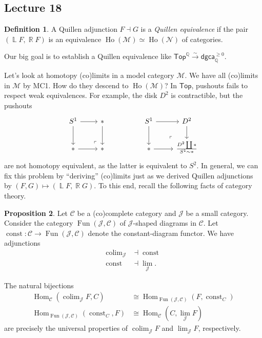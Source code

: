 \documentclass[10pt,letterpaper,cm]{nupset}
\theoremstyle{definition}
\newtheorem{defn}{Definition}[subsection]
\theoremstyle{theorem}
\newtheorem{prop}[defn]{Proposition}
\theoremstyle{remark}
\DeclareMathOperator{\Ll}{\mathbb L}
\newcommand{\Q}{\mathbb Q}
\DeclareMathOperator{\R}{\mathbb{R}}
\newcommand{\1}{\mathbb{1}}
\renewcommand{\c}{\mathcal{C}}
\renewcommand{\j}{\mathcal{J}}
\newcommand{\n}{\mathcal{N}}
\newcommand{\m}{\mathcal{M}}
\newcommand{\dgca}{\mathsf{dgca}}
\newcommand{\0}{\vec 0}
\DeclareMathOperator{\fun}{Fun}
\DeclareMathOperator{\ho}{Ho}
\DeclareMathOperator{\Hom}{Hom}
\DeclareMathOperator{\colim}{colim}
\DeclareMathOperator{\const}{const}
\begin{document}
\subsection{Lecture 18}

\begin{defn}
A Quillen adjunction $F \dashv G$ is a \textit{Quillen equivalence} if the pair $\left(\Ll{F}, \R{F}\right)$ is an equivalence $\ho(\m) \simeq \ho(\n)$ of categories. 
\end{defn}

Our big goal is to establish a Quillen equivalence like $\mathsf{Top}^{\Q} \xrightarrow{\sim} \dgca_{\Q}^{\geq 0}$.

\bigskip

Let's look at homotopy (co)limits in a model category $\m$. We have all (co)limits in $\m$ by MC1. How do they descend to $\ho(\m)$? In $\mathsf{Top}$, pushouts fails to respect weak equivalences. For example, the disk $D^2$ is contractible, but the pushouts
\[
\begin{tikzcd}
	{S^1} & \ast && {S^1} & {D^2} \\
	\ast & \ast && \ast & {\frac{D^2 \coprod \ast}{S^1 \sim \ast}}
	\arrow[from=1-1, to=2-1]
	\arrow[from=1-1, to=1-2]
	\arrow[from=2-1, to=2-2]
	\arrow[from=1-2, to=2-2]
	\arrow[from=1-4, to=2-4]
	\arrow[from=1-4, to=1-5]
	\arrow[from=1-5, to=2-5]
	\arrow[from=2-4, to=2-5]
	\arrow["\lrcorner"{anchor=center, pos=0.125, rotate=180}, draw=none, from=2-5, to=1-4]
	\arrow["\lrcorner"{anchor=center, pos=0.125, rotate=180}, draw=none, from=2-2, to=1-1]
\end{tikzcd}
\] are not homotopy equivalent, as the latter is equivalent to $S^2$. In general, we can fix this problem by ``deriving'' (co)limits just as we derived Quillen adjunctions by $\left(F, G\right) \mapsto \left(\Ll{F}, \R{G}\right)$. To this end, recall the following facts of category theory.

\begin{prop}
Let $\c$ be a (co)complete category and $\j$ be a small category. Consider the category $\fun(\j, \c)$ of $\j$-shaped diagrams in $\c$. Let $\const : \c \to \fun(\j, \c)$ denote the constant-diagram functor. We have adjunctions
\begin{align*}
\colim_{\j} & \dashv \const
\\ \const & \dashv \lim_{\j}
.\end{align*}
\end{prop}

The natural bijections
\begin{align*}
\Hom_{\c}(\colim_{\j}{F}, C) & \cong \Hom_{\fun(\j, \c)}(F, \const_C)
\\ \Hom_{\fun(\j, \c)}(\const_C, F) &  \cong \Hom_{\c}(C, \lim_{\j}{F})
\end{align*}
are precisely the universal properties of $\colim_{\j}{F}$ and $\lim_{\j}{F}$, respectively. 
\end{document}
